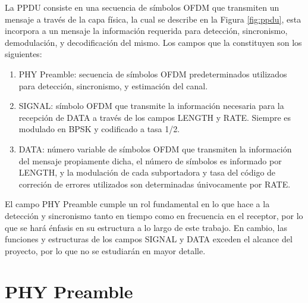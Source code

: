La PPDU consiste en una secuencia de símbolos OFDM que transmiten un mensaje a través de la capa física, la cual se describe en la Figura \ref*{fig:ppdu}, esta incorpora a un mensaje la información requerida para detección, sincronismo, demodulación, y decodificación del mismo. Los campos que la constituyen son los siguientes:

\begin{enumerate}
    \item PHY Preamble: secuencia de símbolos OFDM predeterminados utilizados para detección, sincronismo, y estimación del canal.
    \item SIGNAL: símbolo OFDM que transmite la información necesaria para la recepción de DATA a través de los campos LENGTH y RATE. Siempre es modulado en BPSK y codificado a tasa 1/2.
    \item DATA: número variable de símbolos OFDM que transmiten la información del mensaje propiamente dicha, el número de símbolos es informado por LENGTH, y la modulación de cada subportadora y tasa del código de correción de errores utilizados son determinadas únivocamente por RATE.
\end{enumerate}

El campo PHY Preamble cumple un rol fundamental en lo que hace a la detección y sincronismo tanto en tiempo como en frecuencia en el receptor,  por lo que se hará énfasis en su estructura a lo largo de este trabajo. En cambio, las funciones y estructuras de los campos SIGNAL y DATA exceden el alcance del proyecto, por lo que no se estudiarán en mayor detalle.

\section{PHY Preamble}
\label{S:ch2-preambulo}


